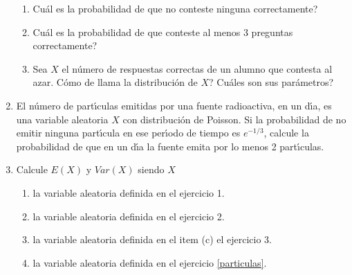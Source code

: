 \documentclass[11pt,a4paper,twoside]{article}%
\begin{document}
\begin{enumerate}
\begin{enumerate}
	\item \textquestiondown Cu\'{a}l es la probabilidad de que no conteste ninguna correctamente?
	
	\item \textquestiondown Cu\'{a}l es la probabilidad de que conteste al menos 3
	preguntas correctamente?
	
 \item Sea $X$ el n\'umero de respuestas correctas de un alumno que contesta al azar. \textquestiondown C\'omo de llama la  distribuci\'on de $X$?
 \textquestiondown Cu\'ales son sus par\'ametros?  	
	
\end{enumerate}


\item \label{particulas} El n\'{u}mero de part\'{\i}culas emitidas por una fuente radioactiva, en
un d\'{\i}a, es una variable aleatoria $X$ con distribuci\'{o}n de Poisson. Si
la probabilidad de no emitir ninguna part\'{\i}cula en ese per\'{\i}odo de
tiempo es $e^{-1/3}$, calcule la
probabilidad de que en un d\'{\i}a la fuente emita por lo menos 2 part\'{\i}culas.



\item Calcule $E(X)$ y $Var(X)$  siendo $X$
\begin{enumerate}
	\item la variable aleatoria definida en el ejercicio 1.
	\item la variable aleatoria definida en el ejercicio 2.
	\item la variable aleatoria definida en el item (c) el ejercicio 3.
	\item la variable aleatoria definida en el  ejercicio \ref{particulas}.
	\end{enumerate}



\end{enumerate}
\end{document}
